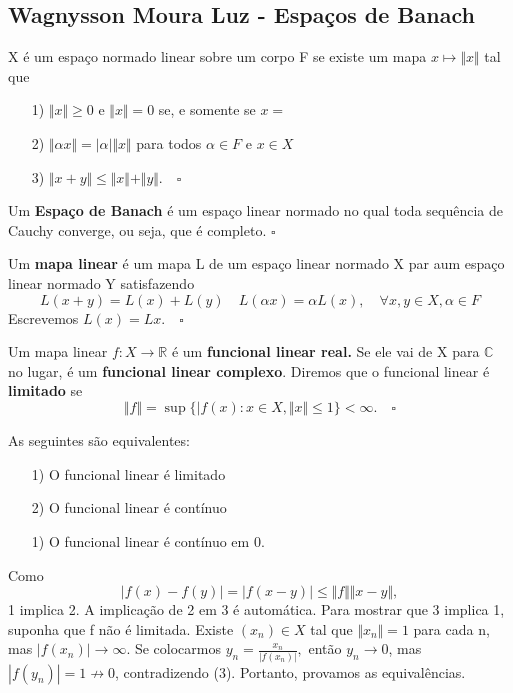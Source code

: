\documentclass[measure_theory.tex]{subfiles}
\begin{document}
\subsection{Wagnysson Moura Luz - Espaços de Banach}
\begin{def*}
	X é um espaço normado linear sobre um corpo F se existe um mapa \(x\mapsto \Vert x \Vert\) tal que
	\begin{itemize}
		\item[1)] \(\Vert x \Vert \geq 0\) e \(\Vert x \Vert = 0\) se, e somente se \(x=\)
		\item[2)] \(\Vert \alpha x \Vert = |\alpha |\Vert x \Vert\) para todos \(\alpha \in F\) e \(x\in X\)
		\item[3)] \(\Vert x + y \Vert \leq \Vert x \Vert + \Vert y \Vert. \quad \square\)
	\end{itemize}
\end{def*}
\begin{def*}
	Um \textbf{Espaço de Banach} é um espaço linear normado no qual toda sequência de Cauchy converge, ou seja, que é completo. \(\square\)
\end{def*}
\begin{def*}
	Um \textbf{mapa linear} é um mapa L de um espaço linear normado X par aum espaço linear normado Y satisfazendo
	\[
		L(x+y) = L(x) + L(y)\quad L(\alpha x) = \alpha L(x),\quad \forall x, y\in X, \alpha \in F
	\]
	Escrevemos \(L(x) = Lx. \quad \square\)
\end{def*}
\begin{def*}
	Um mapa linear \(f:X\rightarrow \mathbb{R}\) é um \textbf{funcional linear real.} Se ele vai de X para \(\mathbb{C}\) no lugar, é um \textbf{funcional linear complexo}. Diremos que o funcional linear é \textbf{limitado } se
	\[
		\Vert f \Vert = \sup_{}\{|f(x):x\in X, \Vert x \Vert \leq 1\} < \infty. \quad \square
	\]
\end{def*}
\begin{prop*}
	As seguintes são equivalentes:
	\begin{itemize}
		\item[1)] O funcional linear é limitado
		\item[2)] O funcional linear é contínuo
		\item[1)] O funcional linear é contínuo em 0.
	\end{itemize}
\end{prop*}
\begin{proof*}
	Como
	\[
		|f(x) - f(y)| = |f(x-y)|\leq \Vert f \Vert\Vert x-y \Vert,
	\]
	1 implica 2. A implicação de 2 em 3 é automática. Para mostrar que 3 implica 1, suponha que f não é limitada. Existe \((x_{n})\in X\) tal que \(\Vert x_{n} \Vert = 1\) para cada n, mas \(|f(x_{n})|\to \infty.\) Se colocarmos \(y_{n} = \frac{x_{n}}{|f(x_{n})|},\) então \(y_{n}\to 0\), mas
	\(|f(y_{n})| = 1\not\to 0\), contradizendo (3). Portanto, provamos as equivalências. \qedsymbol
\end{proof*}
\end{document}
